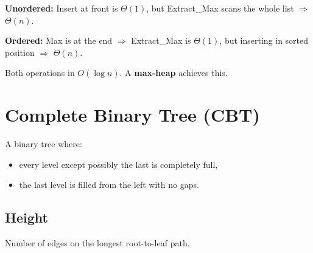 \documentclass[11pt]{article}
\newcommand{\heapcoords}{\foreach \hi/\hx/\hy in {1/0/4.5,2/-2.3/3.0,3/2.3/3.0,4/-3.45/1.6,5/-1.15/1.6,6/1.15/1.6,7/3.45/1.6,8/-4.0/0.2,9/-2.9/0.2,10/-1.75/0.2}{\coordinate (p\hi) at (\hx,\hy);}}
\newcommand{\drawheap}[2]{%
  \heapcoords
  \begin{scope}[on background layer]\foreach \a/\b in {#2}{\draw[hedge] (p\a)--(p\b);}\end{scope}
  \foreach \idx/\val/\col in {#1}{%
     \node[hnode,text=\col] (n\idx) at (p\idx) {\val};
     \node[hidx] at ([shift={(-0.30,0.30)}]p\idx) {\idx};}
}
\begin{document}
\textbf{Unordered:} Insert at front is $\Theta(1)$, but Extract\_Max scans the whole list $\Rightarrow$ $\Theta(n)$.

\textbf{Ordered:} Max is at the end $\Rightarrow$ Extract\_Max is $\Theta(1)$, but inserting in sorted position $\Rightarrow$ $\Theta(n)$.

\begin{keybox}[Goal]
Both operations in \textcolor{rustW}{$O(\log n)$}. A \textbf{max-heap} achieves this.
\end{keybox}

\section{Complete Binary Tree (CBT)}

\begin{defbox}
A binary tree where:
\begin{itemize}[leftmargin=1.4em,itemsep=1pt]
  \item every level except possibly the last is completely full,
  \item the last level is filled \textcolor{rustW}{from the left} with no gaps.
\end{itemize}
\end{defbox}

\begin{center}
\end{center}

\subsection{Height}

\begin{defbox}
Number of \textcolor{rustW}{edges} on the longest root-to-leaf path.
\end{defbox}

\begin{center}
\end{center}
\end{document}

